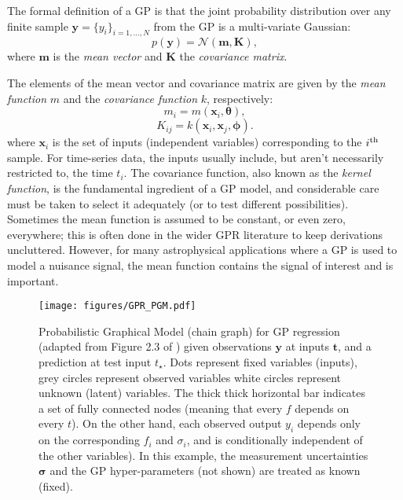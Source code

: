 \documentclass[letterpaper]{ar-1col}
\newcommand{\hyperparams}{\ensuremath{\boldsymbol{\phi}}}
\newcommand{\meanparams}{\ensuremath{\boldsymbol{\theta}}}
\begin{document}
The formal definition of a GP is that the joint probability distribution over any finite sample $\mathbf{y} = \{y_i\}_{i=1,\ldots,N}$ from the GP is a multi-variate Gaussian:
\begin{equation}
\label{eq:gp_def}
    p(\mathbf{y}) = \mathcal{N}(\mathbf{m}, \mathbf{K}),
\end{equation}
where $\mathbf{m}$ is the \emph{mean vector} and $\mathbf{K}$ the \emph{covariance matrix}.

The elements of the mean vector and covariance matrix are given by the \textit{mean function} $m$ and the \textit{covariance function} $k$, respectively:
\begin{equation}
    m_{i} = m(\boldsymbol{x}_i, \meanparams),
\end{equation}
\begin{equation}
    K_{ij} = k(\boldsymbol{x}_i,\boldsymbol{x}_j, \hyperparams).
\end{equation}
where $\boldsymbol{x}_i$ is the set of inputs (independent variables) corresponding to the $i^{\rm th}$ sample. For time-series data, the inputs usually include, but aren't necessarily restricted to, the time $t_i$. The covariance function, also known as the \emph{kernel function}, is the fundamental ingredient of a GP model, and considerable care must be taken to select it adequately (or to test different possibilities). Sometimes the mean function is assumed to be constant, or even zero, everywhere; this is often done in the wider GPR literature to keep derivations uncluttered. However, for many astrophysical applications where a GP is used to model a nuisance signal, the mean function contains the signal of interest and is important.

\begin{figure}[ht]
  \centering
  \texttt{[image: figures/GPR\_PGM.pdf]}
  \caption{Probabilistic Graphical Model (chain graph) for GP regression (adapted from Figure 2.3 of \citealt{gpml}) given observations $\mathbf{y}$ at inputs $\mathbf{t}$, and a prediction at test input $t_\star$. Dots represent fixed variables (inputs), grey circles represent observed variables white circles represent unknown (latent) variables. The thick thick horizontal bar indicates a set of fully connected nodes (meaning that every $f$ depends on every $t$). On the other hand, each observed output $y_i$ depends only on the corresponding $f_i$ and $\sigma_i$, and is conditionally independent of the other variables). In this example, the measurement uncertainties $\boldsymbol{\sigma}$ and the GP hyper-parameters (not shown) are treated as known (fixed).}
  \label{fig:GPR_PGM}
\end{figure}
\end{document}
